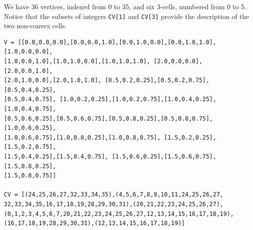 \documentclass[11pt,oneside]{article}	%
\begin{document}
We have 36 vertices, indexed from 0 to 35, and six 3-cells, numbered from 0 to 5.
Notice that the subsets of integers  \texttt{CV[1]} and \texttt{CV[3]} provide the 
description of the two non-convex cells.

\begin{verbatim}
V = [[0.0,0.0,0.0],[0.0,0.0,1.0],[0.0,1.0,0.0],[0.0,1.0,1.0], [1.0,0.0,0.0],
[1.0,0.0,1.0],[1.0,1.0,0.0],[1.0,1.0,1.0], [2.0,0.0,0.0],[2.0,0.0,1.0],
[2.0,1.0,0.0],[2.0,1.0,1.0], [0.5,0.2,0.25],[0.5,0.2,0.75],[0.5,0.4,0.25],
[0.5,0.4,0.75], [1.0,0.2,0.25],[1.0,0.2,0.75],[1.0,0.4,0.25],[1.0,0.4,0.75], 
[0.5,0.6,0.25],[0.5,0.6,0.75],[0.5,0.8,0.25],[0.5,0.8,0.75], [1.0,0.6,0.25],
[1.0,0.6,0.75],[1.0,0.8,0.25],[1.0,0.8,0.75], [1.5,0.2,0.25],[1.5,0.2,0.75],
[1.5,0.4,0.25],[1.5,0.4,0.75], [1.5,0.6,0.25],[1.5,0.6,0.75],[1.5,0.8,0.25],
[1.5,0.8,0.75]]

CV = [(24,25,26,27,32,33,34,35),(4,5,6,7,8,9,10,11,24,25,26,27,
32,33,34,35,16,17,18,19,28,29,30,31),(20,21,22,23,24,25,26,27),
(0,1,2,3,4,5,6,7,20,21,22,23,24,25,26,27,12,13,14,15,16,17,18,19),
(16,17,18,19,28,29,30,31),(12,13,14,15,16,17,18,19)]
\end{verbatim}
\end{document}
